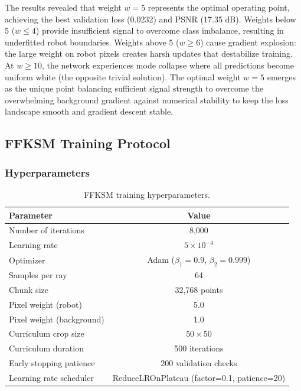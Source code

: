 \documentclass[12pt,a4paper,oneside]{report}
\begin{document}
The results revealed that weight $w = 5$ represents the optimal operating point, achieving the best validation loss (0.0232) and PSNR (17.35 dB). Weights below 5 ($w \leq 4$) provide insufficient signal to overcome class imbalance, resulting in underfitted robot boundaries. Weights above 5 ($w \geq 6$) cause gradient explosion: the large weight on robot pixels creates harsh updates that destabilize training. At $w \geq 10$, the network experiences mode collapse where all predictions become uniform white (the opposite trivial solution). The optimal weight $w = 5$ emerges as the unique point balancing sufficient signal strength to overcome the overwhelming background gradient against numerical stability to keep the loss landscape smooth and gradient descent stable.

\subsection{FFKSM Training Protocol}
\label{subsec:ffksm_training_protocol}

\subsubsection{Hyperparameters}

\begin{table}[H]
\centering
\caption{FFKSM training hyperparameters.}
\label{tab:ffksm_hyperparams}
\begin{tabular}{lc}
\toprule
Parameter & Value \\
\midrule
Number of iterations & 8,000 \\
Learning rate & $5 \times 10^{-4}$ \\
Optimizer & Adam ($\beta_1=0.9$, $\beta_2=0.999$) \\
Samples per ray & 64 \\
Chunk size & 32,768 points \\
Pixel weight (robot) & 5.0 \\
Pixel weight (background) & 1.0 \\
Curriculum crop size & $50 \times 50$ \\
Curriculum duration & 500 iterations \\
Early stopping patience & 200 validation checks \\
Learning rate scheduler & ReduceLROnPlateau (factor=0.1, patience=20) \\
\bottomrule
\end{tabular}
\end{table}
\end{document}
